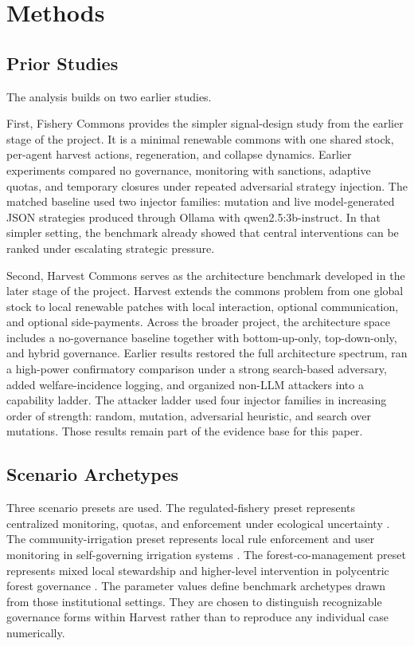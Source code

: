 \section{Methods}

\subsection{Prior Studies}

The analysis builds on two earlier studies.

First, Fishery Commons provides the simpler signal-design study from the earlier stage of the project. It is a minimal renewable commons with one shared stock, per-agent harvest actions, regeneration, and collapse dynamics. Earlier experiments compared no governance, monitoring with sanctions, adaptive quotas, and temporary closures under repeated adversarial strategy injection. The matched baseline used two injector families: mutation and live model-generated JSON strategies produced through Ollama with qwen2.5:3b-instruct. In that simpler setting, the benchmark already showed that central interventions can be ranked under escalating strategic pressure.

Second, Harvest Commons serves as the architecture benchmark developed in the later stage of the project. Harvest extends the commons problem from one global stock to local renewable patches with local interaction, optional communication, and optional side-payments. Across the broader project, the architecture space includes a no-governance baseline together with bottom-up-only, top-down-only, and hybrid governance. Earlier results restored the full architecture spectrum, ran a high-power confirmatory comparison under a strong search-based adversary, added welfare-incidence logging, and organized non-LLM attackers into a capability ladder. The attacker ladder used four injector families in increasing order of strength: random, mutation, adversarial heuristic, and search over mutations. Those results remain part of the evidence base for this paper.

\subsection{Scenario Archetypes}

Three scenario presets are used. The regulated-fishery preset represents centralized monitoring, quotas, and enforcement under ecological uncertainty \citep{hilborn2005, gutierrez2011}. The community-irrigation preset represents local rule enforcement and user monitoring in self-governing irrigation systems \citep{ostrom1993, ostrom1994, villamayor2020}. The forest-co-management preset represents mixed local stewardship and higher-level intervention in polycentric forest governance \citep{nagendra2012}. The parameter values define benchmark archetypes drawn from those institutional settings. They are chosen to distinguish recognizable governance forms within Harvest rather than to reproduce any individual case numerically.

